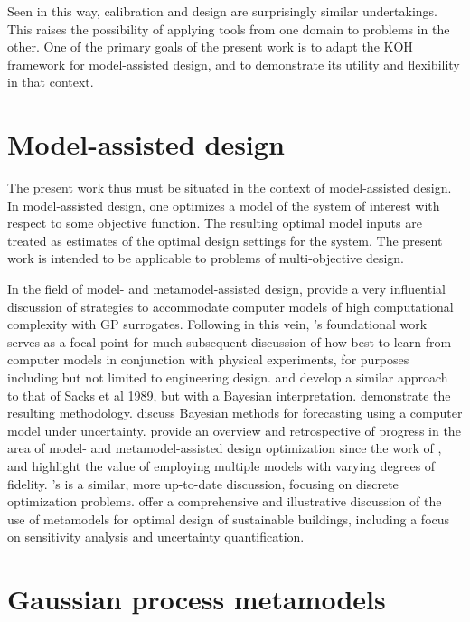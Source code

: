 \documentclass[10pt,a4paper]{article}
\begin{document}
Seen in this way, calibration and design are surprisingly similar undertakings. 
This raises the possibility of applying tools from one domain to problems in the other.
One of the primary goals of the present work is to adapt the KOH framework for model-assisted design, and to demonstrate its utility and flexibility in that context.


\section{Model-assisted design}

The present work thus must be situated in the context of model-assisted design.
In model-assisted design, one optimizes a model of the system of interest with respect to some objective function.
The resulting optimal model inputs are treated as estimates of the optimal design settings for the system.
The present work is intended to be applicable to problems of multi-objective design.

In the field of model- and metamodel-assisted design, \citet{Sacks1989} provide a very influential discussion of strategies to accommodate computer models of high computational complexity with GP surrogates.
Following in this vein, \citeauthor{Santner2003a}'s \citeyearpar{Santner2003a} foundational work serves as a focal point for much subsequent discussion of how best to learn from computer models in conjunction with physical experiments, for purposes including but not limited to engineering design.
\citet{Currin1988} and \citet{Currin1991} develop a similar approach to that of Sacks et al 1989, but with a Bayesian interpretation.
\citet{Mitchell1992} demonstrate the resulting methodology.
\citet{Craig2001} discuss Bayesian methods for forecasting using a computer model under uncertainty.
\citet{Simpson2008} provide an overview and retrospective of progress in the area of model- and metamodel-assisted design optimization since the work of \citet{Sacks1989}, and highlight the value of employing multiple models with varying degrees of fidelity.
\citeauthor{Bartz2017}'s \citeyearpar{Bartz2017} is a similar, more up-to-date discussion, focusing on discrete optimization problems.
\cite{Westermann2019} offer a comprehensive and illustrative discussion of the use of metamodels for optimal design of sustainable buildings, including a focus on sensitivity analysis and uncertainty quantification.

\section{Gaussian process metamodels}
\end{document}
